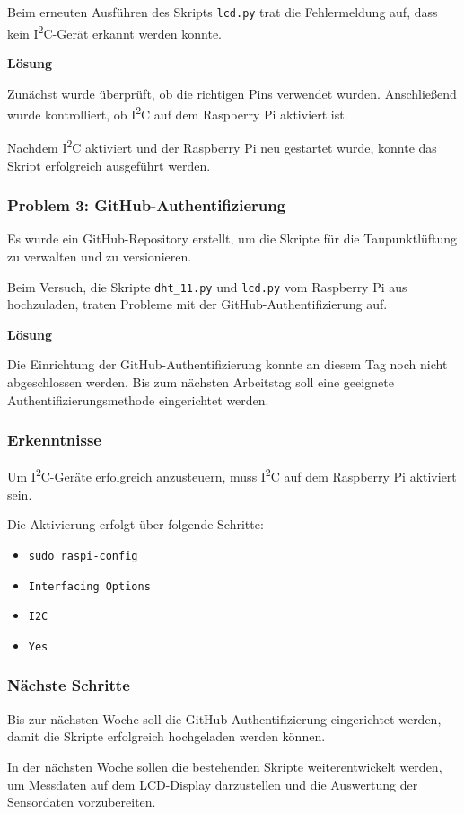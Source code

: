 Beim erneuten Ausführen des Skripts \texttt{lcd.py} trat die
Fehlermeldung auf, dass kein I\textsuperscript{2}C-Gerät erkannt
werden konnte.

\textbf{Lösung}

Zunächst wurde überprüft, ob die richtigen Pins verwendet wurden.
Anschließend wurde kontrolliert, ob I\textsuperscript{2}C auf dem
Raspberry Pi aktiviert ist.

Nachdem I\textsuperscript{2}C aktiviert und der Raspberry Pi neu
gestartet wurde, konnte das Skript erfolgreich ausgeführt werden.

\subsubsection{Problem 3: GitHub-Authentifizierung}

Es wurde ein GitHub-Repository erstellt, um die Skripte für die
Taupunktlüftung zu verwalten und zu versionieren.

Beim Versuch, die Skripte \texttt{dht\_11.py} und
\texttt{lcd.py} vom Raspberry Pi aus hochzuladen, traten Probleme
mit der GitHub-Authentifizierung auf.

\textbf{Lösung}

Die Einrichtung der GitHub-Authentifizierung konnte an diesem Tag
noch nicht abgeschlossen werden. Bis zum nächsten Arbeitstag soll
eine geeignete Authentifizierungsmethode eingerichtet werden.

\subsubsection{Erkenntnisse}

Um I\textsuperscript{2}C-Geräte erfolgreich anzusteuern, muss
I\textsuperscript{2}C auf dem Raspberry Pi aktiviert sein.

Die Aktivierung erfolgt über folgende Schritte:

\begin{itemize}
    \item \texttt{sudo raspi-config}
    \item \texttt{Interfacing Options}
    \item \texttt{I2C}
    \item \texttt{Yes}
\end{itemize}


\subsubsection{Nächste Schritte}

Bis zur nächsten Woche soll die GitHub-Authentifizierung
eingerichtet werden, damit die Skripte erfolgreich hochgeladen
werden können.

In der nächsten Woche sollen die bestehenden Skripte weiterentwickelt
werden, um Messdaten auf dem LCD-Display darzustellen und die
Auswertung der Sensordaten vorzubereiten.
